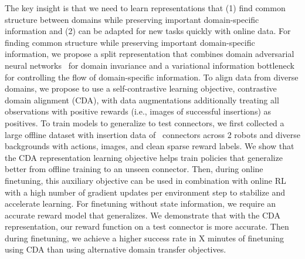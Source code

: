 \documentclass[letterpaper, 10 pt, conference, final]{ieeeconf}   %
\begin{document}
The key insight is that we need to learn representations that (1) find common structure between domains while preserving important domain-specific information and (2) can be adapted for new tasks quickly with online data.
For finding common structure while preserving important domain-specific information, we propose a split representation that combines domain adversarial neural networks~\cite{ganin2016domainadversarial} for domain invariance and a variational information bottleneck~\cite{alemi2017vib}
for controlling the flow of domain-specific information.
To align data from diverse domains, we propose to use a self-contrastive learning objective, contrastive domain alignment (CDA),
with data augmentations additionally treating all observations with positive rewards (i.e., images of successful insertions) as positives.
To train models to generalize to test connectors, we first collected a large offline dataset with insertion data of \numconnectors~connectors across 2 robots and diverse backgrounds with actions, images, and clean sparse reward labels.
We show that the CDA representation learning objective helps train policies that generalize better from offline training to an unseen connector. 
Then, during online finetuning, this auxiliary objective can be used in combination with online RL with a high number of gradient updates per environment step to stabilize and accelerate learning.
For finetuning without state information, we require an accurate reward model that generalizes.
We demonstrate that with the CDA representation, our reward function on a test connector is more accurate.
Then during finetuning, we achieve a higher success rate in X minutes of finetuning using CDA than using alternative domain transfer objectives.
\end{document}
